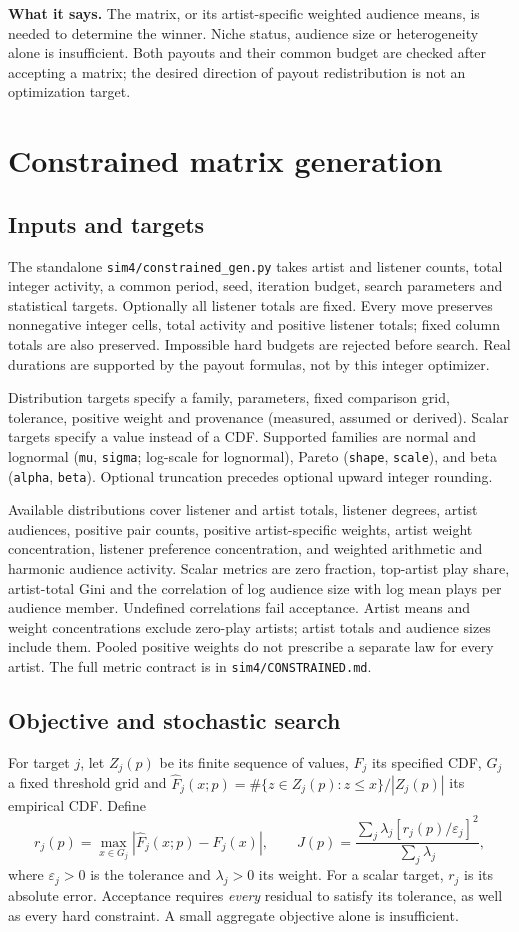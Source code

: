 \documentclass[11pt]{article}
\newcommand{\whatitsays}[1]{\par\medskip\noindent\textbf{What it says.} #1\par\medskip}
\begin{document}
\whatitsays{The matrix, or its artist-specific weighted audience means,
is needed to determine the winner. Niche status, audience size or
heterogeneity alone is insufficient. Both payouts and their common budget
are checked after accepting a matrix; the desired direction of payout
redistribution is not an optimization target.}

\section{Constrained matrix generation}
\subsection{Inputs and targets}
The standalone \texttt{sim4/constrained\_gen.py} takes artist and listener
counts, total integer activity, a common period, seed, iteration budget,
search parameters and statistical targets. Optionally all listener totals
are fixed. Every move preserves nonnegative integer cells, total activity
and positive listener totals; fixed column totals are also preserved.
Impossible hard budgets are rejected before search. Real durations are
supported by the payout formulas, not by this integer optimizer.

Distribution targets specify a family, parameters, fixed comparison grid,
tolerance, positive weight and provenance (measured, assumed or derived).
Scalar targets specify a value instead of a CDF. Supported families are
normal and lognormal (\texttt{mu}, \texttt{sigma}; log-scale for lognormal),
Pareto (\texttt{shape}, \texttt{scale}), and beta (\texttt{alpha}, \texttt{beta}).
Optional truncation precedes optional upward integer rounding.

Available distributions cover listener and artist totals, listener degrees,
artist audiences, positive pair counts, positive artist-specific weights,
artist weight concentration, listener preference concentration, and
weighted arithmetic and harmonic audience activity. Scalar metrics are
zero fraction, top-artist play share, artist-total Gini and the correlation
of log audience size with log mean plays per audience member. Undefined
correlations fail acceptance. Artist means and weight concentrations
exclude zero-play artists; artist totals and audience sizes include them.
Pooled positive weights do not prescribe a separate law for every artist.
The full metric contract is in \texttt{sim4/CONSTRAINED.md}.

\subsection{Objective and stochastic search}
For target $j$, let $Z_j(p)$ be its finite sequence of values,
$F_j$ its specified CDF, $G_j$ a fixed threshold grid and
$\widehat F_j(x;p)=\#\{z\in Z_j(p):z\le x\}/|Z_j(p)|$ its empirical CDF.
Define
\[
r_j(p)=\max_{x\in G_j}|\widehat F_j(x;p)-F_j(x)|,
\qquad
J(p)=\frac{\sum_j\lambda_j[r_j(p)/\varepsilon_j]^2}{\sum_j\lambda_j},
\]
where $\varepsilon_j>0$ is the tolerance and $\lambda_j>0$ its weight.
For a scalar target, $r_j$ is its absolute error. Acceptance requires
\emph{every} residual to satisfy its tolerance, as well as every hard
constraint. A small aggregate objective alone is insufficient.
\end{document}
